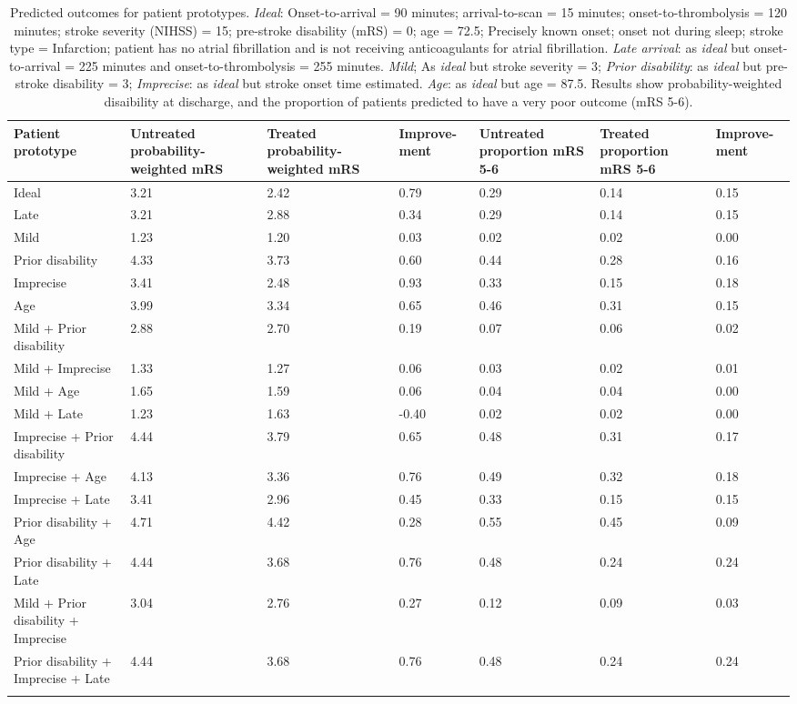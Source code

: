 \begin{minipage}{1\textwidth}
\small
\begin{longtable}{p{5cm}| p{1.5cm} p{1.5cm} p{1.5cm}| p{1.5cm} p{1.5cm} p{1.5cm}}
\caption{Predicted outcomes for patient prototypes. \textit{Ideal}: Onset-to-arrival = 90 minutes; arrival-to-scan = 15 minutes; onset-to-thrombolysis = 120 minutes; stroke severity (NIHSS) = 15; pre-stroke disability (mRS) = 0; age = 72.5; Precisely known onset; onset not during sleep; stroke type = Infarction; patient has no atrial fibrillation and is not receiving anticoagulants for atrial fibrillation. \textit{Late arrival}: as \textit{ideal} but onset-to-arrival = 225 minutes and onset-to-thrombolysis = 255 minutes. \textit{Mild}; As \textit{ideal} but stroke severity = 3; \textit{Prior disability}: as \textit{ideal} but pre-stroke disability = 3; \textit{Imprecise}: as \textit{ideal} but stroke onset time estimated. \textit{Age}: as \textit{ideal} but age = 87.5. Results show probability-weighted disaibility at discharge, and the proportion of patients predicted to have a very poor outcome (mRS 5-6).}\\
\toprule
\endhead
Patient prototype & Untreated probability-weighted mRS & Treated probability-weighted mRS & Improve-ment & Untreated proportion mRS 5-6 & Treated proportion mRS 5-6 & Improve-ment\tabularnewline
\midrule
Ideal & 3.21 & 2.42 & 0.79 & 0.29 & 0.14 & 0.15\tabularnewline
Late & 3.21 & 2.88 & 0.34 & 0.29 & 0.14 & 0.15\tabularnewline
Mild & 1.23 & 1.20 & 0.03 & 0.02 & 0.02 & 0.00\tabularnewline
Prior disability & 4.33 & 3.73 & 0.60 & 0.44 & 0.28 & 0.16\tabularnewline
Imprecise & 3.41 & 2.48 & 0.93 & 0.33 & 0.15 & 0.18\tabularnewline
Age & 3.99 & 3.34 & 0.65 & 0.46 & 0.31 & 0.15\tabularnewline
Mild + Prior disability & 2.88 & 2.70 & 0.19 & 0.07 & 0.06 & 0.02\tabularnewline
Mild + Imprecise & 1.33 & 1.27 & 0.06 & 0.03 & 0.02 & 0.01\tabularnewline
Mild + Age & 1.65 & 1.59 & 0.06 & 0.04 & 0.04 & 0.00\tabularnewline
Mild + Late & 1.23 & 1.63 & -0.40 & 0.02 & 0.02 & 0.00\tabularnewline
Imprecise + Prior disability & 4.44 & 3.79 & 0.65 & 0.48 & 0.31 & 0.17\tabularnewline
Imprecise + Age & 4.13 & 3.36 & 0.76 & 0.49 & 0.32 & 0.18\tabularnewline
Imprecise + Late & 3.41 & 2.96 & 0.45 & 0.33 & 0.15 & 0.15\tabularnewline
Prior disability + Age & 4.71 & 4.42 & 0.28 & 0.55 & 0.45 & 0.09\tabularnewline
Prior disability + Late & 4.44 & 3.68 & 0.76 & 0.48 & 0.24 & 0.24\tabularnewline
Mild + Prior disability + Imprecise & 3.04 & 2.76 & 0.27 & 0.12 & 0.09 & 0.03\tabularnewline
Prior disability + Imprecise + Late & 4.44 & 3.68 & 0.76 & 0.48 & 0.24 & 0.24\tabularnewline
\bottomrule
\label{tab:prototype_outcomes}
\end{longtable}
\normalsize
\end{minipage}

